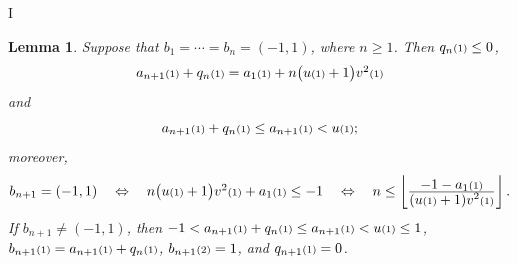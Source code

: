 I\documentclass[12pt]{article}
\newtheorem{lemma}[theorem]{Lemma}
\newcommand{\kkk}[1]{\ensuremath{\textstyle\mathsmaller{({#1})}}}
\begin{document}
\begin{lemma}
\label{l:5}
Suppose that $b_1=\cdots = b_n = (-1,1)$, where $n\geq 1$. 
Then $q_n\kkk{1}\leq 0$, 
\begin{equation}
  \label{e:1911092am}
a_{n+1}\kkk{1}+q_n\kkk{1} = a_1\kkk{1}+n\big(u\kkk{1}+1\big)v^2\kkk{1}
\end{equation}
and 
\begin{equation}
  \label{e:191109c}
  a_{n+1}\kkk{1}+q_n\kkk{1}\leq a_{n+1}\kkk{1}<u\kkk{1};
\end{equation}
moreover, 
\begin{equation}
  \label{e:1911092am+}
b_{n+1} = (-1,1)
\quad
\Leftrightarrow
\quad
n\big(u\kkk{1}+1\big)v^2\kkk{1}+a_1\kkk{1}\leq -1
\quad
\Leftrightarrow
\quad
n\leq \left\lfloor \frac{\displaystyle -1-a_1\kkk{1}}{\displaystyle(u\kkk{1}+1)v^2\kkk{1}} \right\rfloor. 
\end{equation}
If $b_{n+1}\neq (-1,1)$, 
then 
$-1 < a_{n+1}\kkk{1} + q_n\kkk{1} \leq a_{n+1}\kkk{1}<u\kkk{1}\leq 1$,
$b_{n+1}\kkk{1} = a_{n+1}\kkk{1} + q_n\kkk{1}$, 
$b_{n+1}\kkk{2} = 1$, 
and
$q_{n+1}\kkk{1} = 0$. 
\end{lemma}
\end{document}
